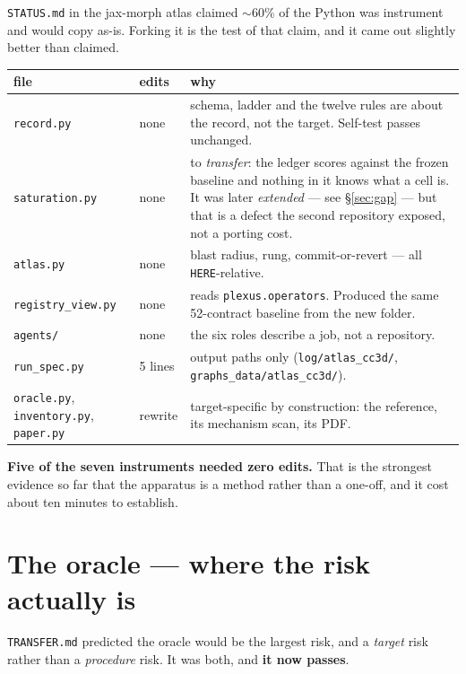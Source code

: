 \documentclass[11pt,a4paper]{article}
\newcommand{\code}[1]{\texttt{#1}}
\begin{document}
\code{STATUS.md} in the jax-morph atlas claimed $\sim$60\% of the Python was instrument and would
copy as-is. Forking it is the test of that claim, and it came out slightly better than claimed.

\begin{center}
\small
\begin{tabular}{@{}l l p{7.6cm}@{}}
\toprule
\textbf{file} & \textbf{edits} & \textbf{why}\\
\midrule
\code{record.py} & \textcolor{good}{none} & schema, ladder and the twelve rules are about the
record, not the target. Self-test passes unchanged.\\
\code{saturation.py} & \textcolor{good}{none} & to \emph{transfer}: the ledger scores against the
frozen baseline and nothing in it knows what a cell is. It was later \emph{extended} --- see
\S\ref{sec:gap} --- but that is a defect the second repository exposed, not a porting cost.\\
\code{atlas.py} & \textcolor{good}{none} & blast radius, rung, commit-or-revert --- all
\code{HERE}-relative.\\
\code{registry\_view.py} & \textcolor{good}{none} & reads \code{plexus.operators}. Produced the
same 52-contract baseline from the new folder.\\
\code{agents/} & \textcolor{good}{none} & the six roles describe a job, not a repository.\\
\code{run\_spec.py} & \textcolor{warn}{5 lines} & output paths only
(\code{log/atlas\_cc3d/}, \code{graphs\_data/atlas\_cc3d/}).\\
\code{oracle.py}, \code{inventory.py}, \code{paper.py} & \textcolor{bad}{rewrite} & target-specific
by construction: the reference, its mechanism scan, its PDF.\\
\bottomrule
\end{tabular}
\end{center}

\textbf{Five of the seven instruments needed zero edits.} That is the strongest evidence so far
that the apparatus is a method rather than a one-off, and it cost about ten minutes to establish.

\section{The oracle --- where the risk actually is}\label{sec:oracle}

\code{TRANSFER.md} predicted the oracle would be the largest risk, and a \emph{target} risk rather
than a \emph{procedure} risk. It was both, and \textbf{it now passes}.
\end{document}

